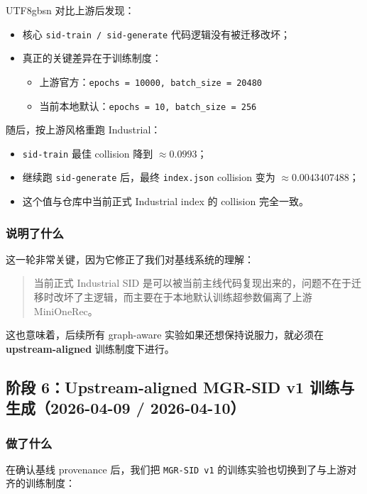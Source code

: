 \documentclass[11pt]{article}
\begin{document}
\begin{CJK*}{UTF8}{gbsn}
对比上游后发现：

\begin{itemize}
  \item 核心 \texttt{sid-train / sid-generate} 代码逻辑没有被迁移改坏；
  \item 真正的关键差异在于训练制度：
  \begin{itemize}
    \item 上游官方：\texttt{epochs = 10000, batch\_size = 20480}
    \item 当前本地默认：\texttt{epochs = 10, batch\_size = 256}
  \end{itemize}
\end{itemize}

随后，按上游风格重跑 Industrial：

\begin{itemize}
  \item \texttt{sid-train} 最佳 collision 降到 \(\approx 0.0993\)；
  \item 继续跑 \texttt{sid-generate} 后，最终 \texttt{index.json} collision 变为 \(\approx 0.0043407488\)；
  \item 这个值与仓库中当前正式 Industrial index 的 collision 完全一致。
\end{itemize}

\subsubsection*{说明了什么}

这一轮非常关键，因为它修正了我们对基线系统的理解：

\begin{quote}
当前正式 Industrial SID 是可以被当前主线代码复现出来的，问题不在于迁移时改坏了主逻辑，而主要在于本地默认训练超参数偏离了上游 MiniOneRec。
\end{quote}

这也意味着，后续所有 graph-aware 实验如果还想保持说服力，就必须在 \textbf{upstream-aligned} 训练制度下进行。

\subsection{阶段 6：Upstream-aligned MGR-SID v1 训练与生成（2026-04-09 / 2026-04-10）}

\subsubsection*{做了什么}

在确认基线 provenance 后，我们把 \texttt{MGR-SID v1} 的训练实验也切换到了与上游对齐的训练制度：


\end{CJK*}
\end{document}
